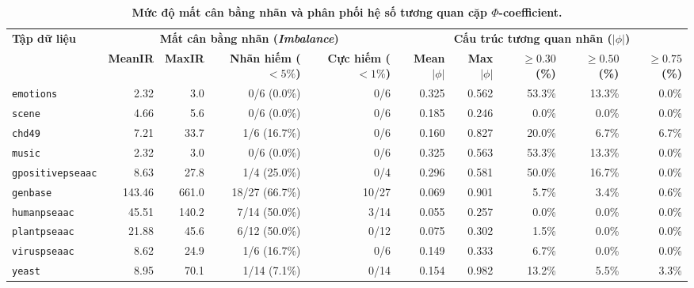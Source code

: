 \documentclass[11pt,a4paper]{article}
\begin{document}
\begin{table}[htbp]
\centering
\small
\caption{\textbf{Mức độ mất cân bằng nhãn và phân phối hệ số tương quan cặp $\Phi$-coefficient.}}
\label{tab:imbalance_corr}
\begin{tabularx}{\textwidth}{l r r r r r r r r r}
\toprule
\multirow{2}{*}{\textbf{Tập dữ liệu}} & \multicolumn{4}{c}{\textbf{Mất cân bằng nhãn (\textit{Imbalance})}} & \multicolumn{5}{c}{\textbf{Cấu trúc tương quan nhãn ($|\phi|$)}} \\
\cmidrule(lr){2-5} \cmidrule(lr){6-10}
 & \textbf{MeanIR} & \textbf{MaxIR} & \textbf{Nhãn hiếm ($<5\%$)} & \textbf{Cực hiếm ($<1\%$)} & \textbf{Mean $|\phi|$} & \textbf{Max $|\phi|$} & \textbf{$\ge 0.30$ (\%)} & \textbf{$\ge 0.50$ (\%)} & \textbf{$\ge 0.75$ (\%)} \\
\midrule
\texttt{emotions} & 2.32 & 3.0 & 0/6 (0.0\%) & 0/6 & 0.325 & 0.562 & 53.3\% & 13.3\% & 0.0\% \\
\texttt{scene} & 4.66 & 5.6 & 0/6 (0.0\%) & 0/6 & 0.185 & 0.246 & 0.0\% & 0.0\% & 0.0\% \\
\texttt{chd49} & 7.21 & 33.7 & 1/6 (16.7\%) & 0/6 & 0.160 & 0.827 & 20.0\% & 6.7\% & 6.7\% \\
\texttt{music} & 2.32 & 3.0 & 0/6 (0.0\%) & 0/6 & 0.325 & 0.563 & 53.3\% & 13.3\% & 0.0\% \\
\texttt{gpositivepseaac} & 8.63 & 27.8 & 1/4 (25.0\%) & 0/4 & 0.296 & 0.581 & 50.0\% & 16.7\% & 0.0\% \\
\texttt{genbase} & 143.46 & 661.0 & 18/27 (66.7\%) & 10/27 & 0.069 & 0.901 & 5.7\% & 3.4\% & 0.6\% \\
\texttt{humanpseaac} & 45.51 & 140.2 & 7/14 (50.0\%) & 3/14 & 0.055 & 0.257 & 0.0\% & 0.0\% & 0.0\% \\
\texttt{plantpseaac} & 21.88 & 45.6 & 6/12 (50.0\%) & 0/12 & 0.075 & 0.302 & 1.5\% & 0.0\% & 0.0\% \\
\texttt{viruspseaac} & 8.62 & 24.9 & 1/6 (16.7\%) & 0/6 & 0.149 & 0.333 & 6.7\% & 0.0\% & 0.0\% \\
\texttt{yeast} & 8.95 & 70.1 & 1/14 (7.1\%) & 0/14 & 0.154 & 0.982 & 13.2\% & 5.5\% & 3.3\% \\
\bottomrule
\end{tabularx}
\end{table}
\end{document}
